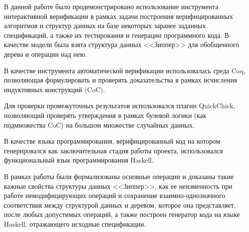 \Conc

В данной работе было продемонстрировано использование инструмента интерактивной верификации в рамках задачи построения верифицированных алгоритмов и структур данных на базе некоторых заранее заданных спецификаций, а также их тестирования и генерации программного кода. В качестве модели была взята структура данных <<Зиппер>> для обобщенного дерева и операции над нею.

В качестве инструмента автоматической верификации использовалась среда Coq, позволяющая формулировать и проверять доказательства в рамках исчисления индуктивных конструкций (CoC).

Для проверки промежуточных результатов использовался плагин QuickChick, позволяющий проверять утверждения в рамках булевой логики (как подмножества CoC) на большом множестве случайных данных.

В качестве языка программирования, верифицированный код на котором генерировался как заключительная стадия работы проекта, использовался функциональный язык программирования Haskell.

В рамках работы были формализованы основные операции и доказаны такие важные свойства структуры данных <<Зиппер>>, как ее неизменность при работе немодифицирующих операций и сохранение взаимно-однозначного соответствия между структурой данных и деревом, которое она представляет, после любых допустимых операций, а также построен генератор кода на языке Haskell, отражающего исходные спецификации.

\newpage

\printbibliography[%
    heading=bibintoc%
]

\appendix
{}



